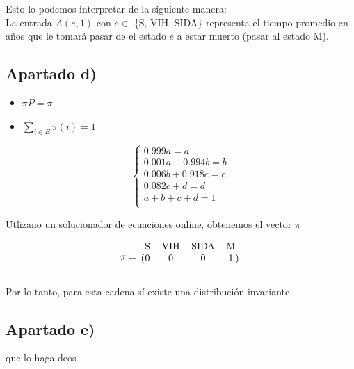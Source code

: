 \documentclass[11pt]{article}
\begin{document}
Esto lo podemos interpretar de la siguiente manera: \\
La entrada $A(e, 1)$ con $e \in$ \{S, VIH, SIDA\} representa el tiempo promedio en años
que le tomará pasar de el estado $e$ a estar muerto (pasar al estado M).


\subsection*{Apartado d)}

\begin{itemize}
  \item $\pi P = \pi$
  \item $\displaystyle\sum_{i \in E} \pi(i) = 1$
\end{itemize}

\[
\begin{cases}
  0.999a = a \\
  0.001a + 0.994b=b \\
  0.006b+0.918c=c \\
  0.082c+d = d \\
  a+b+c+d=1 \\
\end{cases}
\]

Utlizano un solucionador de ecuaciones online, obtenemos el vector $\pi$

\begin{equation*}
  \pi = 
  \begin{blockarray}{cccc}
     \text{S} & \text{VIH} & \text{SIDA} & \text{M} \\
    \begin{block}{(cccc)}
      0 & 0 & 0 & 1 \\
    \end{block}
  \end{blockarray}
\end{equation*}

Por lo tanto, para esta cadena sí existe una distribución invariante.


\subsection*{Apartado e)}

que lo haga deos

\end{document}
